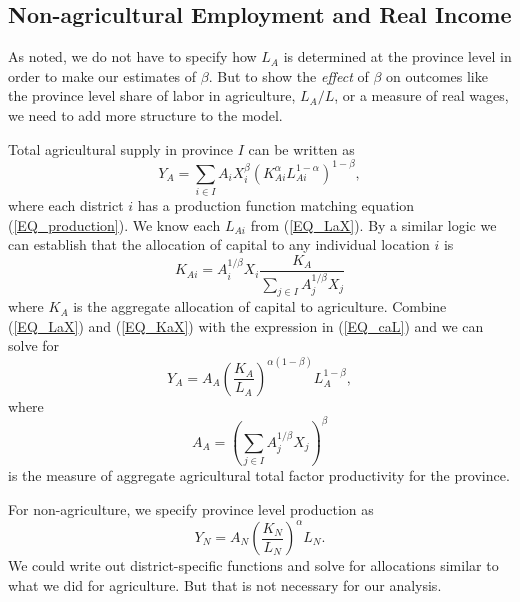 \documentclass[11pt]{article}
\begin{document}
\subsection{Non-agricultural Employment and Real Income}\label{SEC_LAL_y}
As noted, we do not have to specify how $L_A$ is determined at the province level in order to make our estimates of $\beta$. But to show the \textit{effect} of $\beta$ on outcomes like the province level share of labor in agriculture, $L_A/L$, or a measure of real wages, we need to add more structure to the model.

Total agricultural supply in province $I$ can be written as
\begin{equation}
Y_A = \sum_{i \in I} A_{i} X_{i}^{\beta} \left(K_{Ai}^{\alpha}L_{Ai}^{1-\alpha}\right)^{1-\beta}, \label{EQ_caL}
\end{equation}
where each district $i$ has a production function matching equation (\ref{EQ_production}). We know each $L_{Ai}$ from (\ref{EQ_LaX}). By a similar logic we can establish that the allocation of capital to any individual location $i$ is
\begin{equation}
	K_{Ai} = A_{i}^{1/\beta} X_i \frac{K_A}{\sum_{j\in I} A_{j}^{1/\beta}X_{j}} \label{EQ_KaX}
\end{equation}
where $K_A$ is the aggregate allocation of capital to agriculture. Combine (\ref{EQ_LaX}) and (\ref{EQ_KaX}) with the expression in (\ref{EQ_caL}) and we can solve for 
\begin{equation}
	Y_A = A_A \left(\frac{K_A}{L_A}\right)^{\alpha(1-\beta)} L_A^{1-\beta}, \label{EQ_caL_solve}
\end{equation}
where 
\begin{equation}
    A_A = \left(\sum_{j\in I} A_{j}^{1/\beta}X_{j} \right)^\beta
\end{equation}
is the measure of aggregate agricultural total factor productivity for the province.

For non-agriculture, we specify province level production as 
\begin{equation}
    Y_N = A_N \left(\frac{K_N}{L_N}\right)^{\alpha} L_N. \label{EQ_YN}
\end{equation}
We could write out district-specific functions and solve for allocations similar to what we did for agriculture. But that is not necessary for our analysis.
\end{document}
